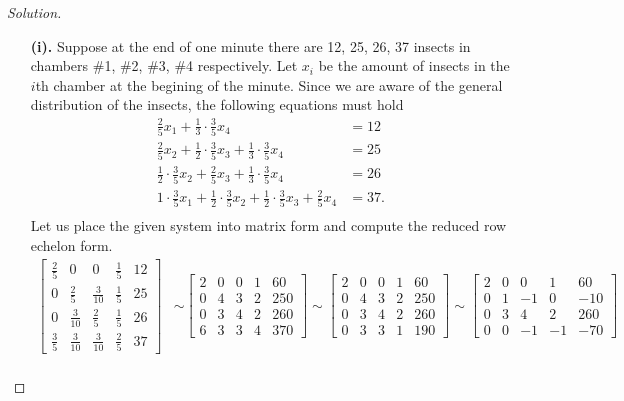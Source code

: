 \documentclass[ 12pt ]{article}
\begin{document}
\begin{enumerate}
	\begin{proof}[Solution]\renewcommand{\qedsymbol}{}
		\begin{enumerate}
			\item[\textbf{(i).}] Suppose at the end of one minute there are 12, 25, 26, 37 insects in chambers \#1, \#2, \#3, \#4 respectively. Let $x_i$ be the amount of
				insects in the $i$th chamber at the begining of the minute. Since we are aware of the general distribution of the insects, the following equations must hold
				\begin{align*}
					\frac{2}{5}x_1+\frac{1}{3}\cdot\frac{3}{5}x_4 &= 12 \\
					\frac{2}{5}x_2+\frac{1}{2}\cdot\frac{3}{5}x_3+\frac{1}{3}\cdot\frac{3}{5}x_4 &= 25 \\
					\frac{1}{2}\cdot\frac{3}{5}x_2+\frac{2}{5}x_3+\frac{1}{3}\cdot\frac{3}{5}x_4 &= 26 \\
					1\cdot\frac{3}{5}x_1+\frac{1}{2}\cdot\frac{3}{5}x_2+\frac{1}{2}\cdot\frac{3}{5}x_3+\frac{2}{5}x_4 &= 37. \\
				\end{align*}
				Let us place the given system into matrix form and compute the reduced row echelon form.
				\begin{align*}
					\begin{bmatrix} \frac{2}{5} & 0 & 0 & \frac{1}{5} & 12 \\ 0 & \frac{2}{5} & \frac{3}{10} & \frac{1}{5} & 25 \\ 0 & \frac{3}{10} & \frac{2}{5} & \frac{1}{5} & 26 \\ \frac{3}{5} & \frac{3}{10} & \frac{3}{10} & \frac{2}{5} & 37 \end{bmatrix}
					&\sim \begin{bmatrix} 2 & 0 & 0 & 1 & 60 \\ 0 & 4 & 3 & 2 & 250 \\ 0 & 3 & 4 & 2 & 260 \\ 6 & 3 & 3 & 4 & 370 \end{bmatrix}
					\sim \begin{bmatrix} 2 & 0 & 0 & 1 & 60 \\ 0 & 4 & 3 & 2 & 250 \\ 0 & 3 & 4 & 2 & 260 \\ 0 & 3 & 3 & 1 & 190 \end{bmatrix}
					\sim \begin{bmatrix} 2 & 0 & 0 & 1 & 60 \\ 0 & 1 & -1 & 0 & -10 \\ 0 & 3 & 4 & 2 & 260 \\ 0 & 0 & -1 & -1 & -70 \end{bmatrix} \\

\end{align*}
\end{enumerate}
\end{proof}
\end{enumerate}
\end{document}
